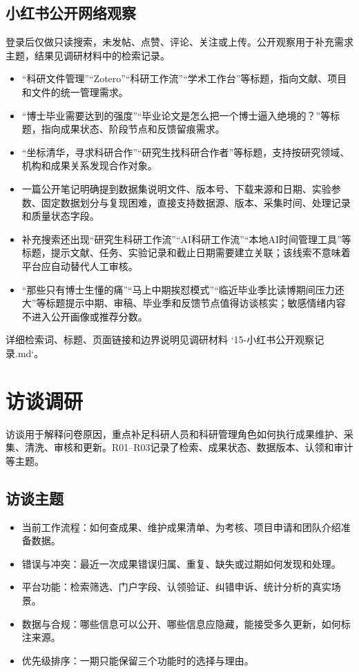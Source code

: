 \documentclass[UTF8,11pt,a4paper]{ctexart}
\begin{document}
\subsection{小红书公开网络观察}
登录后仅做只读搜索，未发帖、点赞、评论、关注或上传。公开观察用于补充需求主题，结果见调研材料中的检索记录。
\begin{itemize}
\item “科研文件管理”“Zotero”“科研工作流”“学术工作台”等标题，指向文献、项目和文件的统一管理需求。
\item “博士毕业需要达到的强度”“毕业论文是怎么把一个博士逼入绝境的？”等标题，指向成果状态、阶段节点和反馈留痕需求。
\item “坐标清华，寻求科研合作”“研究生找科研合作者”等标题，支持按研究领域、机构和成果关系发现合作对象。
\item 一篇公开笔记明确提到数据集说明文件、版本号、下载来源和日期、实验参数、固定数据划分与复现困难，直接支持数据源、版本、采集时间、处理记录和质量状态字段。
\item 补充搜索还出现“研究生科研工作流”“AI科研工作流”“本地AI时间管理工具”等标题，提示文献、任务、实验记录和截止日期需要建立关联；该线索不意味着平台应自动替代人工审核。
\item “那些只有博士生懂的痛”“马上中期挨怼模式”“临近毕业季比读博期间压力还大”等标题提示中期、审稿、毕业季和反馈节点值得访谈核实；敏感情绪内容不进入公开画像或推荐分数。
\end{itemize}
详细检索词、标题、页面链接和边界说明见调研材料 `15-小红书公开观察记录.md`。

\section{访谈调研}
访谈用于解释问卷原因，重点补足科研人员和科研管理角色如何执行成果维护、采集、清洗、审核和更新。R01--R03记录了检索、成果状态、数据版本、认领和审计等主题。

\subsection{访谈主题}
\begin{itemize}
\item 当前工作流程：如何查成果、维护成果清单、为考核、项目申请和团队介绍准备数据。
\item 错误与冲突：最近一次成果错误归属、重复、缺失或过期如何发现和处理。
\item 平台功能：检索筛选、门户字段、认领验证、纠错申诉、统计分析的真实场景。
\item 数据与合规：哪些信息可以公开、哪些信息应隐藏，能接受多久更新，如何标注来源。
\item 优先级排序：一期只能保留三个功能时的选择与理由。
\end{itemize}
\end{document}
